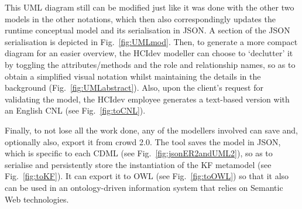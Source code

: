\documentclass[sn-mathphys]{sn-jnl}
\newcommand{\crowdtwo}{{\sf crowd 2.0}\xspace}
\begin{document}
This UML diagram still can be modified just like it was done with the other two models in the other notations, which then also correspondingly updates the runtime conceptual model and its serialisation in JSON. A section of the JSON serialisation is depicted in Fig.~\ref{fig:UMLmod}. Then, to generate a more compact diagram for an easier overview, the HCIdev modeller can choose to `declutter' it by toggling the attributes/methods and the role and relationship names, so as to obtain a simplified visual notation whilst maintaining the details in the background (Fig.~\ref{fig:UMLabstract}). %
Also, upon the client's request for validating the model, the HCIdev employee generates a text-based version with an English CNL (see Fig.~\ref{fig:toCNL}). %

Finally, to not lose all the work done, any of the modellers involved can save and, optionally also, export it from \crowdtwo. The tool saves the model in JSON, which is specific to each CDML (see Fig.~\ref{fig:jsonER2andUML2}), so as to serialise and persistently store the instantiation of the KF metamodel (see Fig.~\ref{fig:toKF}). It can export it to OWL  (see Fig.~\ref{fig:toOWL}) so that it also can be used in an ontology-driven information system that relies on Semantic Web technologies.
\end{document}
